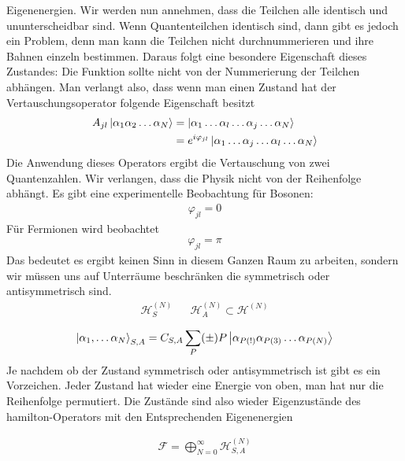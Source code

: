 Eigenenergien. Wir werden nun annehmen, dass die Teilchen alle identisch und
ununterscheidbar sind. Wenn Quantenteilchen identisch sind, dann gibt es jedoch
ein Problem, denn man kann die Teilchen nicht durchnummerieren und ihre Bahnen einzeln bestimmen.
Daraus folgt eine besondere Eigenschaft dieses Zustandes:
Die Funktion sollte nicht von der Nummerierung der Teilchen abh\"angen. Man 
verlangt also, dass wenn man einen Zustand hat der Vertauschungsoperator
folgende Eigenschaft besitzt
%
\begin{align*}
  A_{jl} \Ket{\alpha_1 \alpha_2 \ldots \alpha_N} & = \Ket{\alpha_1 \ldots \alpha_l
  \ldots \alpha_j \ldots \alpha_N} \\
  & = e^{i \varphi_{jl}} \Ket{\alpha_1 \ldots \alpha_j \ldots \alpha_l
\ldots \alpha_N}
\end{align*}
%
Die Anwendung dieses Operators ergibt die Vertauschung von zwei Quantenzahlen.
Wir verlangen, dass die Physik nicht von der Reihenfolge abh\"angt. Es gibt eine
experimentelle Beobachtung f\"ur Bosonen:
%
\begin{align*}
  \varphi_{jl} = 0
\end{align*}
%
F\"ur Fermionen wird beobachtet
%
\begin{align*}
  \varphi_{jl}  = \pi
\end{align*}
%
Das bedeutet es ergibt keinen Sinn in diesem Ganzen Raum zu arbeiten,
sondern wir m\"ussen uns auf Unterr\"aume beschr\"anken die symmetrisch
oder antisymmetrisch sind.
%
\begin{align*}
  \mathcal{H}_S^{(N)} && \mathcal{H}_A^{(N)} \subset \mathcal{H}^{(N)}
\end{align*}
%
%
\begin{align*}
  \Ket{\alpha_1, \ldots \alpha_N}_{S,A} = C_{S,A} \sum_{P}^{} (\pm) P
  \Ket{\alpha_{P(!)} \alpha_{P(3)} \ldots \alpha_{P(N)}}
\end{align*}
%
Je nachdem ob der Zustand symmetrisch oder antisymmetrisch ist gibt es ein
Vorzeichen.  Jeder Zustand hat wieder eine Energie von oben, man hat nur die
Reihenfolge permutiert.  Die Zust\"ande sind also wieder Eigenzust\"ande des
hamilton-Operators mit den Entsprechenden Eigenenergien

%
\begin{align*}
  \mathcal{F} = \bigoplus_{N=0}^{\infty} \mathcal{H}_{S,A}^{(N)}
\end{align*}
%
